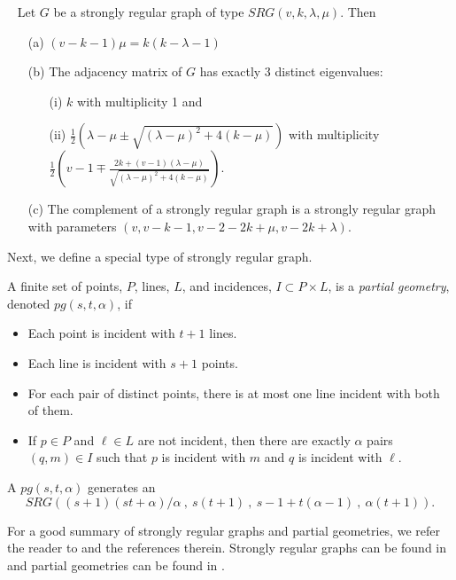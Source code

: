 \begin{theorem} \label{th:srg-stuff} ~ Let $G$ be a strongly regular graph of type $SRG(v,k,\lambda,\mu)$. Then
 \begin{itemize}
  \item[(a)] $(v-k-1)\mu = k(k-\lambda - 1)$
  \item[(b)] The adjacency matrix of $G$ has exactly 3 distinct eigenvalues:
   \begin{itemize}
    \item[(i)] $k$ with multiplicity 1 and
    \item[(ii)] $\frac{1}{2}\left(\lambda - \mu \pm \sqrt{(\lambda-\mu)^2 + 4(k-\mu)}\right)$ with multiplicity $\frac12\left(v-1\mp\frac{2k+(v-1)(\lambda-\mu)}{\sqrt{(\lambda-\mu)^2+4(k-\mu)}}\right)$.
   \end{itemize}
  \item[(c)] The complement of a strongly regular graph is a strongly regular graph with parameters $(v,v-k-1,v-2-2k+\mu,v-2k+\lambda)$.
 \end{itemize}
\end{theorem}

Next, we define a special type of strongly regular graph.

\begin{definition} \label{def:pg}
 A finite set of points, $P$, lines, $L$, and incidences, $I \subset P \times L$, is a {\it partial geometry}, denoted $pg(s,t,\alpha)$, if
 \begin{itemize}
  \item Each point is incident with $t+1$ lines.
  \item Each line is incident with $s+1$ points.
  \item For each pair of distinct points, there is at most one line incident with both of them.
  \item If $p \in P$ and $\ell \in L$ are not incident, then there are exactly $\alpha$ pairs $(q,m) \in I$ such that $p$ is incident with $m$ and $q$ is incident with $\ell$.
 \end{itemize}
\end{definition}

\begin{theorem} \label{th:pg-srg}
 A $pg(s,t,\alpha)$ generates an $$SRG\left((s+1)(st+\alpha)/{\alpha}~,~s(t+1)~,~s-1+t(\alpha-1)~,~\alpha(t+1)\right).$$
\end{theorem}

For a good summary of strongly regular graphs and partial geometries, we refer the reader to \cite{hcd} and the references therein. Strongly regular graphs can be found in \cite[Section VII(11)]{hcd} and partial geometries can be found in \cite[Section VI(41)]{hcd}.

